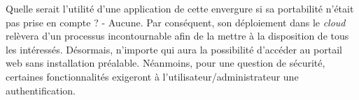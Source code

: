 \par
Quelle serait l'utilité d'une application de cette envergure 
si sa portabilité n'était pas prise en compte ? - Aucune. Par 
conséquent, son déploiement dans le \textit{cloud} relèvera d'un processus incontournable 
afin de la mettre à la disposition de tous les intéressés. Désormais, 
n'importe qui aura la possibilité d'accéder au portail web sans 
installation préalable. Néanmoins, pour une question de sécurité, 
certaines fonctionnalités exigeront à l'utilisateur/administrateur une authentification.